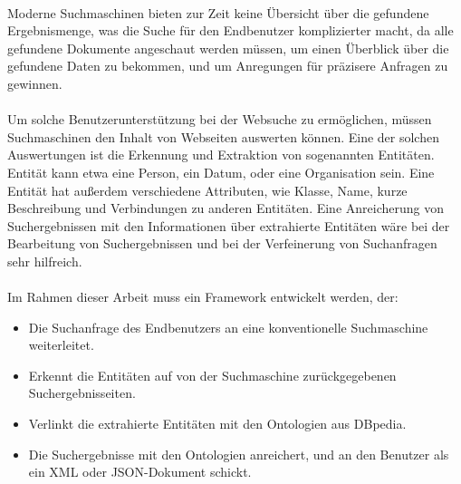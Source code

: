 \paragraph{}
Moderne Suchmaschinen bieten zur Zeit keine Übersicht über die gefundene Ergebnismenge, was die Suche für den Endbenutzer komplizierter macht, da alle gefundene Dokumente angeschaut werden müssen, um einen Überblick über die gefundene Daten zu bekommen, und um Anregungen für präzisere Anfragen zu gewinnen.

\paragraph{}
Um solche Benutzerunterstützung bei der Websuche zu ermöglichen, müssen Suchmaschinen den Inhalt von Webseiten auswerten können. Eine der solchen Auswertungen ist die Erkennung und Extraktion von sogenannten Entitäten. Entität kann etwa eine Person, ein Datum, oder eine Organisation sein. Eine Entität hat außerdem verschiedene Attributen, wie Klasse, Name, kurze Beschreibung und Verbindungen zu anderen Entitäten. Eine Anreicherung von Suchergebnissen mit den Informationen über extrahierte Entitäten wäre bei der Bearbeitung von Suchergebnissen und bei der Verfeinerung von Suchanfragen sehr hilfreich.

\paragraph{}
Im Rahmen dieser Arbeit muss ein Framework entwickelt werden, der:
\begin{itemize}
\item Die Suchanfrage des Endbenutzers an eine konventionelle Suchmaschine weiterleitet.
\item Erkennt die Entitäten auf von der Suchmaschine zurückgegebenen Suchergebnisseiten. 
\item Verlinkt die extrahierte Entitäten mit den Ontologien aus DBpedia.
\item Die Suchergebnisse mit den Ontologien anreichert, und an den Benutzer als ein XML oder JSON-Dokument schickt.
\end{itemize}